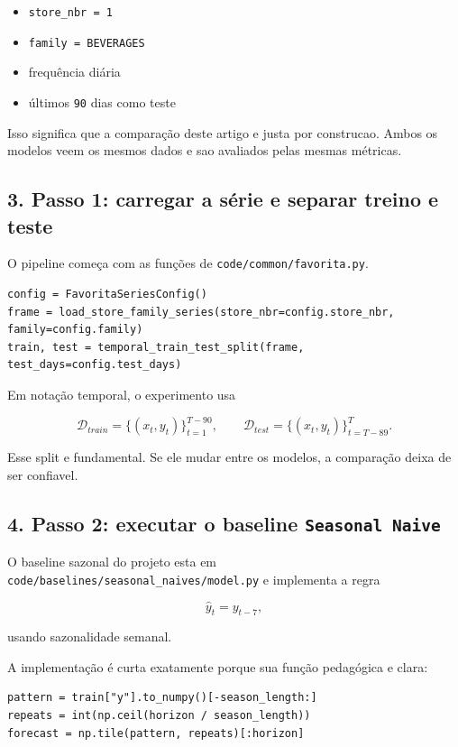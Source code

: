 \documentclass[12pt]{article}
\providecommand{\tightlist}{%
          \setlength{\itemsep}{0pt}\setlength{\parskip}{0pt}}
\begin{document}
\begin{itemize}
\tightlist
\item
  \texttt{store\_nbr\ =\ 1}
\item
  \texttt{family\ =\ BEVERAGES}
\item
  frequência diária
\item
  últimos \texttt{90} dias como teste
\end{itemize}

Isso significa que a comparação deste artigo e justa por construcao. Ambos os modelos veem os mesmos dados e sao avaliados pelas mesmas métricas.

\subsection{3. Passo 1: carregar a série e separar treino e teste}\label{3-passo-1-carregar-a-suxe9rie-e-separar-treino-e-teste}

O pipeline começa com as funções de \texttt{code/common/favorita.py}.

\begin{verbatim}
config = FavoritaSeriesConfig()
frame = load_store_family_series(store_nbr=config.store_nbr, family=config.family)
train, test = temporal_train_test_split(frame, test_days=config.test_days)
\end{verbatim}

Em notação temporal, o experimento usa

\[
\mathcal{D}_{train} = \{(x_t, y_t)\}_{t=1}^{T-90},
\qquad
\mathcal{D}_{test} = \{(x_t, y_t)\}_{t=T-89}^T.
\]

Esse split e fundamental. Se ele mudar entre os modelos, a comparação deixa de ser confiavel.

\subsection{\texorpdfstring{4. Passo 2: executar o baseline \texttt{Seasonal\ Naive}}{4. Passo 2: executar o baseline Seasonal Naive}}\label{4-passo-2-executar-o-baseline-seasonal-naive}

O baseline sazonal do projeto esta em \texttt{code/baselines/seasonal\_naives/model.py} e implementa a regra

\[
\hat{y}_t = y_{t-7},
\]

usando sazonalidade semanal.

A implementação é curta exatamente porque sua função pedagógica e clara:

\begin{verbatim}
pattern = train["y"].to_numpy()[-season_length:]
repeats = int(np.ceil(horizon / season_length))
forecast = np.tile(pattern, repeats)[:horizon]
\end{verbatim}
\end{document}
